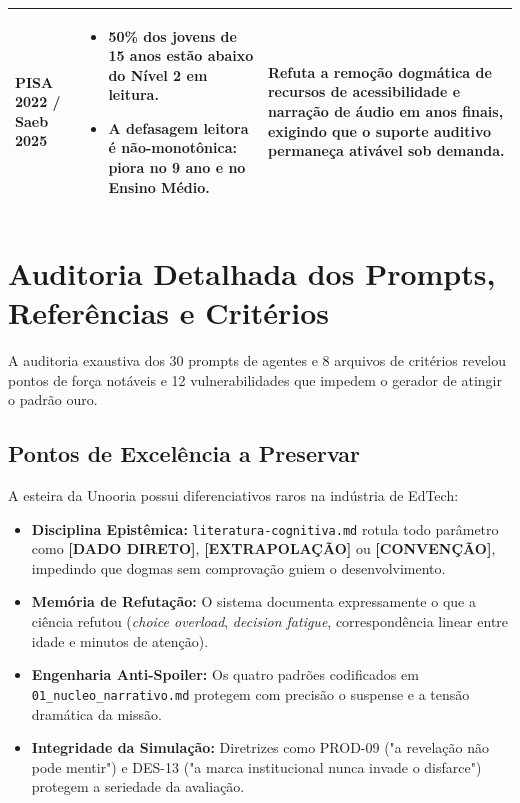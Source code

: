 \documentclass[11pt,a4paper]{article}
\newcommand{\dado}{\textbf{[DADO DIRETO]}}
\newcommand{\extrap}{\textbf{[EXTRAPOLA\c{C}\~AO]}}
\newcommand{\conv}{\textbf{[CONVEN\c{C}\~AO]}}
\begin{document}
\begin{center}
\begin{tabularx}{\textwidth}{@{}l p{5.5cm} X@{}}
\midrule
\textbf{PISA 2022 / Saeb 2025} & 
\begin{itemize}[leftmargin=*]
  \item 50\% dos jovens de 15 anos est\~ao abaixo do N\'ivel 2 em leitura.
  \item A defasagem leitora \'e n\~ao-monot\^onica: piora no 9\textordmasculine{} ano e no Ensino M\'edio.
\end{itemize} & 
Refuta a remo\c{c}\~ao dogm\'atica de recursos de acessibilidade e narra\c{c}\~ao de \'audio em anos finais, exigindo que o suporte auditivo permane\c{c}a ativ\'avel sob demanda. \\
\bottomrule
\end{tabularx}
\end{center}

\section{Auditoria Detalhada dos Prompts, Refer\^encias e Crit\'erios}

A auditoria exaustiva dos 30 prompts de agentes e 8 arquivos de crit\'erios revelou pontos de for\c{c}a not\'aveis e 12 vulnerabilidades que impedem o gerador de atingir o padr\~ao ouro.

\subsection{Pontos de Excel\^encia a Preservar}

A esteira da Unooria possui diferenciativos raros na ind\'ustria de EdTech:
\begin{itemize}
    \item \textbf{Disciplina Epist\^emica:} \texttt{literatura-cognitiva.md} rotula todo par\^ametro como \dado, \extrap{} ou \conv{}, impedindo que dogmas sem comprova\c{c}\~ao guiem o desenvolvimento.
    \item \textbf{Mem\'oria de Refuta\c{c}\~ao:} O sistema documenta expressamente o que a ci\^encia refutou (\emph{choice overload}, \emph{decision fatigue}, correspond\^encia linear entre idade e minutos de aten\c{c}\~ao).
    \item \textbf{Engenharia Anti-Spoiler:} Os quatro padr\~oes codificados em \texttt{01\_nucleo\_narrativo.md} protegem com precis\~ao o suspense e a tens\~ao dram\'atica da miss\~ao.
    \item \textbf{Integridade da Simula\c{c}\~ao:} Diretrizes como PROD-09 ("a revela\c{c}\~ao n\~ao pode mentir") e DES-13 ("a marca institucional nunca invade o disfarce") protegem a seriedade da avalia\c{c}\~ao.
\end{itemize}
\end{document}
